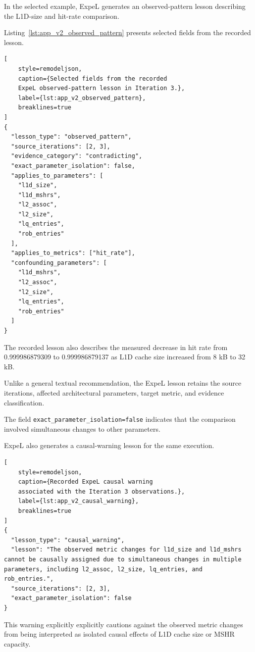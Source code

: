 In the selected example, ExpeL generates
an observed-pattern lesson describing
the L1D-size and hit-rate comparison.

Listing~\ref{lst:app_v2_observed_pattern}
presents selected fields from the recorded
lesson.

\begin{lstlisting}[
    style=remodeljson,
    caption={Selected fields from the recorded
    ExpeL observed-pattern lesson in Iteration 3.},
    label={lst:app_v2_observed_pattern},
    breaklines=true
]
{
  "lesson_type": "observed_pattern",
  "source_iterations": [2, 3],
  "evidence_category": "contradicting",
  "exact_parameter_isolation": false,
  "applies_to_parameters": [
    "l1d_size",
    "l1d_mshrs",
    "l2_assoc",
    "l2_size",
    "lq_entries",
    "rob_entries"
  ],
  "applies_to_metrics": ["hit_rate"],
  "confounding_parameters": [
    "l1d_mshrs",
    "l2_assoc",
    "l2_size",
    "lq_entries",
    "rob_entries"
  ]
}
\end{lstlisting}

The recorded lesson also describes the
measured decrease in hit rate from
0.999986879309 to 0.999986879137
as L1D cache size increased from
8 kB to 32 kB.

Unlike a general textual recommendation,
the ExpeL lesson retains the source
iterations, affected architectural
parameters, target metric, and evidence
classification.

The field
\texttt{exact\_parameter\_isolation=false}
indicates that the comparison involved
simultaneous changes to other parameters.

ExpeL also generates a causal-warning
lesson for the same execution.

\begin{lstlisting}[
    style=remodeljson,
    caption={Recorded ExpeL causal warning
    associated with the Iteration 3 observations.},
    label={lst:app_v2_causal_warning},
    breaklines=true
]
{
  "lesson_type": "causal_warning",
  "lesson": "The observed metric changes for l1d_size and l1d_mshrs cannot be causally assigned due to simultaneous changes in multiple parameters, including l2_assoc, l2_size, lq_entries, and rob_entries.",
  "source_iterations": [2, 3],
  "exact_parameter_isolation": false
}
\end{lstlisting}

This warning explicitly explicitly cautions against the
observed metric changes from being
interpreted as isolated causal effects
of L1D cache size or MSHR capacity.

